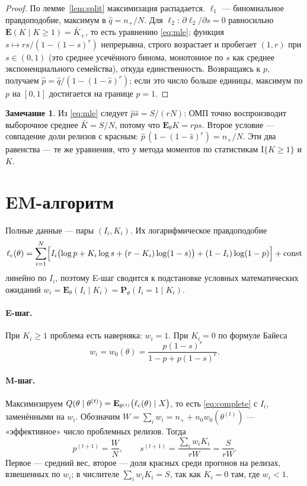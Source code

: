 \documentclass[11pt,a4paper]{article}
\newcommand{\E}{\mathbf{E}}
\newcommand{\Prob}{\mathbf{P}}
\newcommand{\Ind}{\mathrm{I}}
\theoremstyle{plain}
\theoremstyle{definition}
\newtheorem{remark}{Замечание}
\begin{document}
\begin{proof}
По лемме~\ref{lem:split} максимизация распадается. $\ell_1$ --- биномиальное правдоподобие, максимум в $\hat q=n_+/N$. Для $\ell_2$: $\partial\ell_2/\partial s=0$ равносильно $\E(K\mid K\ge1)=\bar K_+$, то есть уравнению \eqref{eq:mle}; функция $s\mapsto rs/(1-(1-s)^r)$ непрерывна, строго возрастает и пробегает $(1,r)$ при $s\in(0,1)$ (это среднее усечённого бинома, монотонное по $s$ как среднее экспоненциального семейства), откуда единственность. Возвращаясь к $p$, получаем $\hat p=\hat q/(1-(1-\hat s)^r)$; если это число больше единицы, максимум по $p$ на $[0,1]$ достигается на границе $p=1$.
\end{proof}

\begin{remark}
Из \eqref{eq:mle} следует $\hat p\hat s=S/(rN)$: ОМП точно воспроизводит выборочное среднее $\bar K=S/N$, потому что $\E_\theta K=rps$. Второе условие --- совпадение доли релизов с красным: $\hat p\,(1-(1-\hat s)^r)=n_+/N$. Эти два равенства --- те же уравнения, что у метода моментов по статистикам $\Ind\{K\ge1\}$ и $K$.
\end{remark}

\section{EM-алгоритм}

Полные данные --- пары $(I_i,K_i)$. Их логарифмическое правдоподобие
\begin{equation}\label{eq:complete}
\ell_{\rm c}(\theta)=\sum_{i=1}^N\Bigl[I_i\bigl(\log p+K_i\log s+(r-K_i)\log(1-s)\bigr)+(1-I_i)\log(1-p)\Bigr]+\mathrm{const}
\end{equation}
линейно по $I_i$, поэтому E-шаг сводится к подстановке условных математических ожиданий $w_i=\E_{\theta}(I_i\mid K_i)=\Prob_\theta(I_i=1\mid K_i)$.

\paragraph{E-шаг.} При $K_i\ge1$ проблема есть наверняка: $w_i=1$. При $K_i=0$ по формуле Байеса
\begin{equation}\label{eq:estep}
w_i=w_0(\theta)=\frac{p(1-s)^r}{1-p+p(1-s)^r}.
\end{equation}

\paragraph{M-шаг.} Максимизируем $Q(\theta\mid\theta^{(t)})=\E_{\theta^{(t)}}\bigl(\ell_{\rm c}(\theta)\mid X\bigr)$, то есть \eqref{eq:complete} с $I_i$, заменёнными на $w_i$. Обозначим $W=\sum_iw_i=n_+ + n_0w_0(\theta^{(t)})$ --- «эффективное» число проблемных релизов. Тогда
\begin{equation}\label{eq:mstep}
p^{(t+1)}=\frac WN,\qquad s^{(t+1)}=\frac{\sum_iw_iK_i}{rW}=\frac S{rW}.
\end{equation}
Первое --- средний вес, второе --- доля красных среди прогонов на релизах, взвешенных по $w_i$; в числителе $\sum_iw_iK_i=S$, так как $K_i=0$ там, где $w_i<1$.
\end{document}
